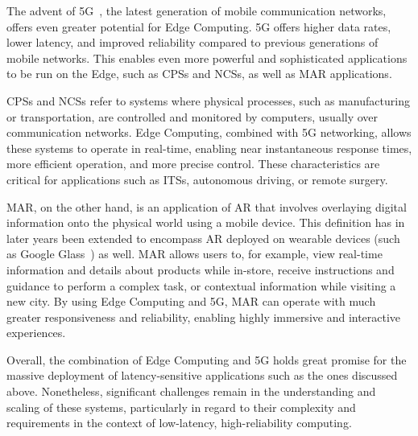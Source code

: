 The advent of 5G~\cite{5Gstandard}, the latest generation of mobile communication networks, offers even greater potential for Edge Computing.
5G offers higher data rates, lower latency, and improved reliability compared to previous generations of mobile networks.
This enables even more powerful and sophisticated applications to be run on the Edge, such as \acsp{CPS} and \acsp{NCS}, as well as \acs{MAR} applications.

\acfp{CPS} and \acfp{NCS} refer to systems where physical processes, such as manufacturing or transportation, are controlled  and monitored by computers, usually over communication networks.
Edge Computing, combined with 5G networking, allows these systems to operate in real-time, enabling near instantaneous response times, more efficient operation, and more precise control.
These characteristics are critical for applications such as \glspl{ITS}, autonomous driving, or remote surgery.

\gls{MAR}, on the other hand, is an application of \gls{AR} that involves overlaying digital information onto the physical world using a mobile device.
This definition has in later years been extended to encompass \gls{AR} deployed on wearable devices (such as Google Glass~\cite{googleglass}) as well.
\gls{MAR} allows users to, for example, view real-time information and details about products while in-store, receive instructions and guidance to perform a complex task, or contextual information while visiting a new city.
By using Edge Computing and 5G, \gls{MAR} can operate with much greater responsiveness and reliability, enabling highly immersive and interactive experiences.

Overall, the combination of Edge Computing and 5G holds great promise for the massive deployment of latency-sensitive applications such as the ones discussed above.
Nonetheless, significant challenges remain in the understanding and scaling of these systems, particularly in regard to their complexity and requirements in the context of low-latency, high-reliability computing.

